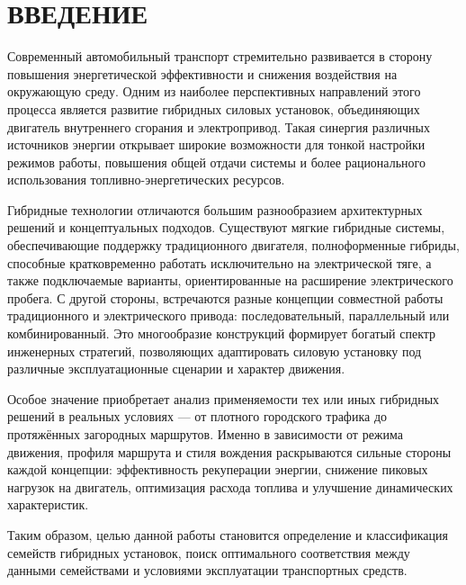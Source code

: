 \chapter*{ВВЕДЕНИЕ}

Современный автомобильный транспорт стремительно развивается в сторону повышения энергетической эффективности и снижения воздействия на окружающую среду. Одним из наиболее перспективных направлений этого процесса является развитие гибридных силовых установок, объединяющих двигатель внутреннего сгорания и электропривод. Такая синергия различных источников энергии открывает широкие возможности для тонкой настройки режимов работы, повышения общей отдачи системы и более рационального использования топливно-энергетических ресурсов.

Гибридные технологии отличаются большим разнообразием архитектурных решений и концептуальных подходов. Существуют мягкие гибридные системы, обеспечивающие поддержку традиционного двигателя, полноформенные гибриды, способные кратковременно работать исключительно на электрической тяге, а также подключаемые варианты, ориентированные на расширение электрического пробега. С другой стороны, встречаются разные концепции совместной работы традиционного и электрического привода: последовательный, параллельный или комбинированный. Это многообразие конструкций формирует богатый спектр инженерных стратегий, позволяющих адаптировать силовую установку под различные эксплуатационные сценарии и характер движения.

Особое значение приобретает анализ применяемости тех или иных гибридных решений в реальных условиях — от плотного городского трафика до протяжённых загородных маршрутов. Именно в зависимости от режима движения, профиля маршрута и стиля вождения раскрываются сильные стороны каждой концепции: эффективность рекуперации энергии, снижение пиковых нагрузок на двигатель, оптимизация расхода топлива и улучшение динамических характеристик.

Таким образом, целью данной работы становится определение и классификация семейств гибридных установок, поиск оптимального соответствия между данными семействами и условиями эксплуатации транспортных средств.